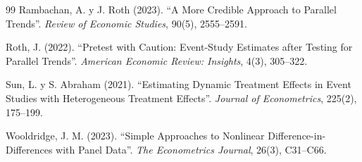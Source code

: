 \documentclass[11pt,a4paper]{article}
\begin{document}
\begin{thebibliography}{99}
Rambachan, A. y J. Roth (2023). ``A More Credible Approach to Parallel Trends''. \emph{Review of Economic Studies}, 90(5), 2555--2591.

Roth, J. (2022). ``Pretest with Caution: Event-Study Estimates after Testing for Parallel Trends''. \emph{American Economic Review: Insights}, 4(3), 305--322.

Sun, L. y S. Abraham (2021). ``Estimating Dynamic Treatment Effects in Event Studies with Heterogeneous Treatment Effects''. \emph{Journal of Econometrics}, 225(2), 175--199.

Wooldridge, J. M. (2023). ``Simple Approaches to Nonlinear Difference-in-Differences with Panel Data''. \emph{The Econometrics Journal}, 26(3), C31--C66.

\end{thebibliography}
\end{document}
